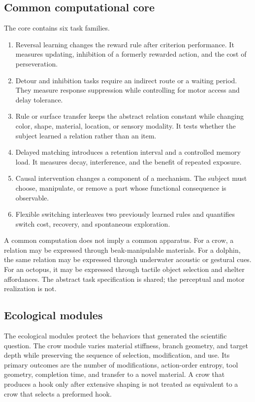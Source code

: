 \documentclass[conference]{IEEEtran}
\begin{document}
\subsection{Common computational core}
The core contains six task families.

\begin{enumerate}
\item Reversal learning changes the reward rule after criterion performance. It measures updating, inhibition of a formerly rewarded action, and the cost of perseveration.
\item Detour and inhibition tasks require an indirect route or a waiting period. They measure response suppression while controlling for motor access and delay tolerance.
\item Rule or surface transfer keeps the abstract relation constant while changing color, shape, material, location, or sensory modality. It tests whether the subject learned a relation rather than an item.
\item Delayed matching introduces a retention interval and a controlled memory load. It measures decay, interference, and the benefit of repeated exposure.
\item Causal intervention changes a component of a mechanism. The subject must choose, manipulate, or remove a part whose functional consequence is observable.
\item Flexible switching interleaves two previously learned rules and quantifies switch cost, recovery, and spontaneous exploration.
\end{enumerate}

A common computation does not imply a common apparatus. For a crow, a relation may be expressed through beak-manipulable materials. For a dolphin, the same relation may be expressed through underwater acoustic or gestural cues. For an octopus, it may be expressed through tactile object selection and shelter affordances. The abstract task specification is shared; the perceptual and motor realization is not.

\subsection{Ecological modules}
The ecological modules protect the behaviors that generated the scientific question. The crow module varies material stiffness, branch geometry, and target depth while preserving the sequence of selection, modification, and use. Its primary outcomes are the number of modifications, action-order entropy, tool geometry, completion time, and transfer to a novel material. A crow that produces a hook only after extensive shaping is not treated as equivalent to a crow that selects a preformed hook.
\end{document}
